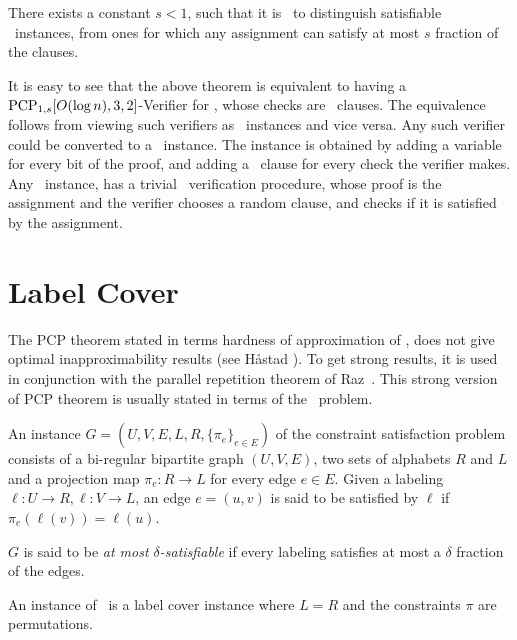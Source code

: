 \begin{theorem} There exists a constant $s
<1$, such that it is \NPHard\ to distinguish satisfiable \MAXTSAT\ instances,
from ones for which any assignment can satisfy at most $s$ fraction of the
clauses. \end{theorem}

It is easy to see that the above theorem is equivalent to having a
$\textsf{\textnormal{PCP}}_{1,s}[O(\log n),3,2]$-Verifier for \MAXTSAT, whose checks are \MAXTSAT\
clauses. The equivalence follows from viewing such verifiers as 
\MAXTSAT\ instances and vice versa.
 Any such verifier could be converted to a \MAXTSAT\ instance.
The instance is obtained by adding a variable for every bit of the proof,
and adding a \MAXTSAT\ clause for every check the verifier makes.
Any \MAXTSAT\ instance, has a trivial \PCP\ verification procedure,
whose proof is the assignment and the verifier chooses a random clause,
and checks if it is satisfied by the assignment.


\section{Label Cover}

The PCP theorem stated in terms hardness of approximation of \MAXTSAT, does not
give optimal inapproximability results (see H\aa stad \cite{Hastad2001}). 
To get strong results, it is used in
conjunction with the parallel repetition theorem of Raz~\cite{Raz1998}. 
This strong version of PCP
theorem is usually stated in terms of the \LabelCover\ problem.

\begin{definition}[\LabelCover]
	
	\label{def:label-cover} An instance $G=(U,V,E,L,
	R,\{\pi_e\}_{e\in E})$ of the {\LC} constraint satisfaction
	problem consists of a bi-regular bipartite graph $(U,V,E)$,
        two sets of alphabets $R$ and $L$ and a projection map $\pi_e : R \rightarrow
        L$ for every edge $e\in E$.
        Given a labeling $\ell : U \rightarrow R, \ell:V \rightarrow
        L$, an edge $e = (u,v)$ is said to be satisfied by $\ell$ if
        $\pi_e(\ell(v)) = \ell(u)$. 

        $G$ is said to be \emph{at most $\delta$-satisfiable} if every
        labeling satisfies at most a $\delta$ fraction of the
        edges. 
        
	An instance of \UG\ is a label cover instance where $L=R$ and the constraints 
	$\pi$ are permutations.
\end{definition}


